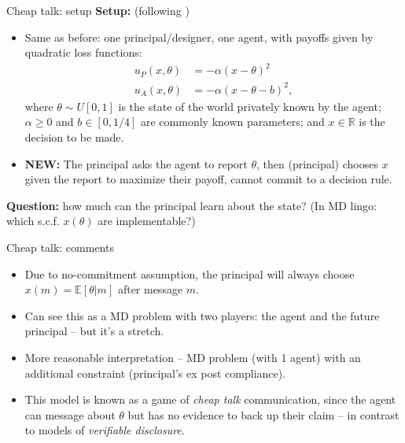 \documentclass[english,10pt
,aspectratio=169
]{beamer}
\begin{document}
\begin{frame}{Cheap talk: setup}
	\textbf{Setup:} (following \cite{crawford_strategic_1982})
	\begin{itemize}
		\item Same as before: one principal/designer, one agent, with payoffs given by quadratic loss functions:
		\begin{align*}
			u_P(x,\theta) &= - \alpha (x-\theta)^2
			\\
			u_A(x,\theta) &= - \alpha (x-\theta-b)^2,
		\end{align*}
		where $\theta \sim U[0,1]$ is the state of the world privately known by the agent; $\alpha \geq 0$ and $b \in [0,1/4]$ are commonly known parameters; and $x \in \mathbb{R}$ is the decision to be made.
		\item \textbf{NEW:} The principal asks the agent to report $\theta$, then (principal) chooses $x$ given the report to maximize their payoff, \alert{cannot commit} to a decision rule.
	\end{itemize}
	\textbf{Question:} how much can the principal learn about the state? (In MD lingo: which s.c.f. $x(\theta)$ are implementable?)
\end{frame}


\begin{frame}{Cheap talk: comments}
	\begin{itemize}
		\item Due to no-commitment assumption, the principal will always choose $x(m) = \mathbb{E}[\theta|m]$ after message $m$.
		\item Can see this as a MD problem with two players: the agent and the future principal -- but it's a stretch. %
		\item More reasonable interpretation -- MD problem (with 1 agent) with an additional constraint (principal's ex post compliance).
		\item This model is known as a game of \emph{cheap talk} communication, since the agent can message about $\theta$ but has no evidence to back up their claim -- in contrast to models of \emph{verifiable disclosure}.
	\end{itemize}
\end{frame}
\end{document}
